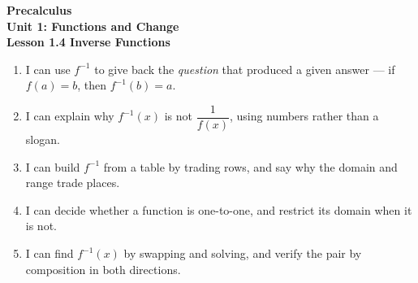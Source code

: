 \documentclass[10pt]{article}
\begin{document}
\vspace{-0.8in}

\begin{center}
  {\color{white}\textbf{\LARGE Precalculus}}\\[4pt]
  {\color{lilacmid}\large\textbf{Unit 1: Functions and Change}}\\[6pt]
  {\color{white}\textbf{\large Lesson 1.4 \quad Inverse Functions}}
\end{center}

\vspace{0.22in}
\namedateperiod
\vspace{0.18in}

\begin{learningtargetbox}
\small
\begin{enumerate}[leftmargin=1.5em, itemsep=5pt]
  \item I can use $f^{-1}$ to give back the \textit{question} that produced a
        given answer --- if $f(a) = b$, then $f^{-1}(b) = a$.
  \item I can explain why $f^{-1}(x)$ is not $\dfrac{1}{f(x)}$, using numbers
        rather than a slogan.
  \item I can build $f^{-1}$ from a table by trading rows, and say why the
        domain and range trade places.
  \item I can decide whether a function is one-to-one, and restrict its domain
        when it is not.
  \item I can find $f^{-1}(x)$ by swapping and solving, and verify the pair by
        composition in both directions.
\end{enumerate}
\end{learningtargetbox}

\vspace{0.14in}
\end{document}
